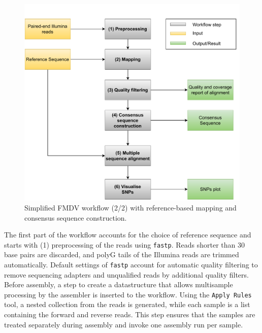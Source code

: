 \begin{figure}[ht!]
	\centering
	\includegraphics[width=1\textwidth]{media/3-fmdv-2-2.pdf}
	\caption{Simplified \ac{FMDV} workflow (2/2) with reference-based mapping and consensus sequence construction.}
	\label{fig:3-fmdv-wf-2}
\end{figure}
The first part of the workflow accounts for the choice of reference sequence and starts with (1) preprocessing of the reads using \texttt{fastp}. Reads shorter than 30 base pairs are discarded, and polyG tails of the Illumina reads are trimmed automatically. Default settings of \texttt{fastp} account for automatic quality filtering to remove sequencing adapters and unqualified reads by additional quality filters. Before assembly, a step to create a datastructure that allows multisample processing by the assembler is inserted to the workflow. Using the \texttt{Apply Rules} tool, a nested collection from the reads is generated, while each sample is a list containing the forward and reverse reads. This step ensures that the samples are treated separately during assembly and invoke one assembly run per sample.\\

